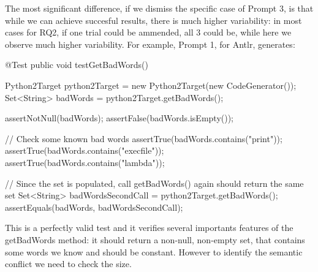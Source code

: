 The most significant difference, if we dismiss the specific case of Prompt 3, is that while we can achieve succesful results,
there is much higher variability: in most cases for RQ2, if one trial could be ammended, all 3 could be, while here we observe much
higher variability. For example, Prompt 1, for Antlr, generates:
\begin{response}
    @Test
    public void testGetBadWords() {
        Python2Target python2Target = new Python2Target(new CodeGenerator());
        Set<String> badWords = python2Target.getBadWords();

        assertNotNull(badWords);
        assertFalse(badWords.isEmpty());

        // Check some known bad words
        assertTrue(badWords.contains("print"));
        assertTrue(badWords.contains("execfile"));
        assertTrue(badWords.contains("lambda"));

        // Since the set is populated, call getBadWords() again should return the same set
        Set<String> badWordsSecondCall = python2Target.getBadWords();
        assertEquals(badWords, badWordsSecondCall);
    }
\end{response}
This is a perfectly valid test and it verifies several importants features of the getBadWords method: it should
return a non-null, non-empty set, that contains some words we know and should be constant. However to identify the semantic
conflict we need to check the size.

